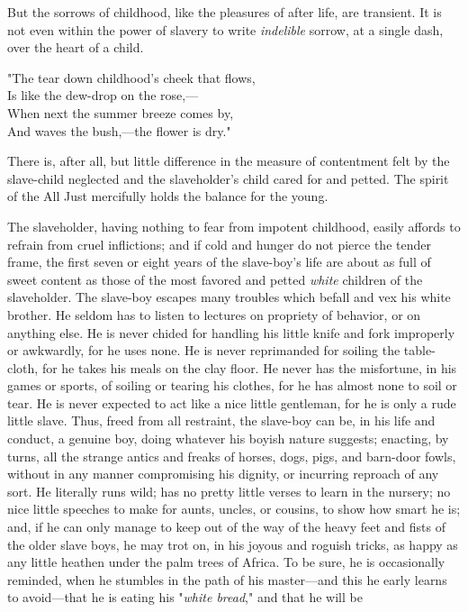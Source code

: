 But the sorrows of childhood, like the pleasures of after life, are
transient. It is not even within the power of slavery to write
\emph{indelible} sorrow, at a single dash, over the heart of a child.

{"}The tear down childhood's cheek that flows,\\
Is like the dew-drop on the rose,---\\
When next the summer breeze comes by,\\
And waves the bush,---the flower is dry."

There is, after all, but little difference in the measure of contentment
felt by the slave-child neglected and the slaveholder's child cared for
and petted. The spirit of the All Just mercifully holds the balance for
the young.

The slaveholder, having nothing to fear from impotent childhood, easily
affords to refrain from cruel inflictions; and if cold and hunger do not
pierce the tender frame, the first seven or eight years of the
slave-boy's life are about as full of sweet content as those of the most
favored and petted \emph{white} children of the slaveholder. The
slave-boy escapes many troubles which befall and vex his white brother.
He seldom has to listen to lectures on propriety of {}behavior, or on
anything else. He is never chided for handling his little knife and fork
improperly or awkwardly, for he uses none. He is never reprimanded for
soiling the table-cloth, for he takes his meals on the clay floor. He
never has the misfortune, in his games or sports, of soiling or tearing
his clothes, for he has almost none to soil or tear. He is never
expected to act like a nice little gentleman, for he is only a rude
little slave. Thus, freed from all restraint, the slave-boy can be, in
his life and conduct, a genuine boy, doing whatever his boyish nature
suggests; enacting, by turns, all the strange antics and freaks of
horses, dogs, pigs, and barn-door fowls, without in any manner
compromising his dignity, or incurring reproach of any sort. He
literally runs wild; has no pretty little verses to learn in the
nursery; no nice little speeches to make for aunts, uncles, or cousins,
to show how smart he is; and, if he can only manage to keep out of the
way of the heavy feet and fists of the older slave boys, he may trot on,
in his joyous and roguish tricks, as happy as any little heathen under
the palm trees of Africa. To be sure, he is occasionally reminded, when
he stumbles in the path of his master---and this he early learns to
avoid---that he is eating his "\emph{white bread}," and that he will be
